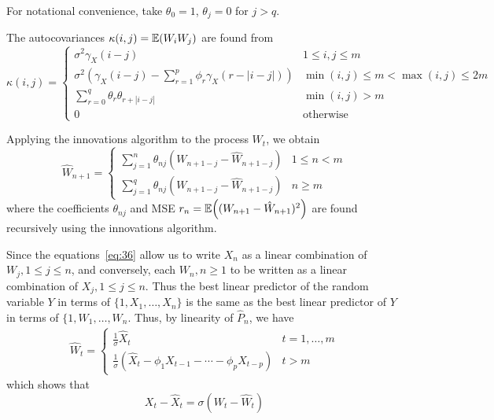 For notational convenience, take $\theta_{0} = 1$, $\theta_{j} = 0 $
for $j > q$.

\begin{lem}
  The autocovariances $\kappa(i, j) = \E{W_{i} W_{j}}$ are found from
  \begin{equation}
    \label{eq:37}
    \kappa(i, j) =
    \begin{cases}
      \sigma^{2} \gamma_{X}(i - j) & 1 \leq i, j \leq m \\
      \sigma^{2} (\gamma_{X}(i - j) - \sum_{r=1}^{p} \phi_{r}
      \gamma_{X}(r - |i-j|)) & \min(i, j) \leq m < \max(i, j) \leq 2m
    \\
    \sum_{r=0}^{q}\theta_{r} \theta_{r + |i-j|} & \min(i, j) > m \\
    0 & \text{otherwise}
    \end{cases}
  \end{equation}

  Applying the innovations algorithm to the process $W_{t}$, we obtain
  \begin{equation}
    \label{eq:38}
    \hat W_{n+1} =
    \begin{cases}
      \sum_{j=1}^{n} \theta_{nj} (W_{n+1-j} - \hat W_{n+1-j}) & 1
      \leq n < m \\
      \sum_{j=1}^{q} \theta_{nj} (W_{n+1-j} - \hat W_{n+1-j}) & n \geq m
    \end{cases}
  \end{equation} where the coefficients $\theta_{nj}$ and MSE $r_{n} =
  \E{(W_{n+1} - \hat W_{n+1})^{2}}$ are found recursively using the
  innovations algorithm.

  Since the equations~\eqref{eq:36} allow us to write $X_{n}$ as a
  linear combination of $W_{j}, 1 \leq j \leq n$, and conversely, each
  $W_{n}, n \geq 1$ to be written as a linear combination of $X_{j}, 1
  \leq j \leq n$.  Thus the best linear predictor of the random
  variable $Y$  in terms of $\{ 1, X_{1}, \dots, X_{n} \}$ is the same
  as the best linear predictor of $Y$ in terms of $\{ 1, W_{1}, \dots,
  W_{n}$.  Thus, by linearity of $\hat P_{n}$, we have
  \begin{align}
    \label{eq:39}
    \hat W_{t} =
    \begin{cases}
      \frac{1}{\sigma} \hat X_{t} & t = 1, \dots, m \\
      \frac{1}{\sigma}(\hat X_{t} - \phi_{1} X_{t-1} - \cdots -
      \phi_{p} X_{t-p}) & t > m
    \end{cases}
  \end{align}
  which shows that
  \begin{equation}
    \label{eq:40}
    X_{t} - \hat X_{t} = \sigma(W_{t} - \hat W_{t})
  \end{equation}


\end{lem}
